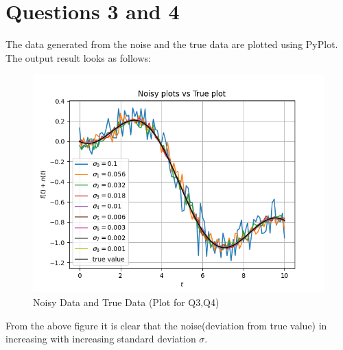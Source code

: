 \documentclass[11pt, a4paper]{article}
\begin{document}
         \section{Questions 3 and 4}
            The data generated from the noise and the true data are plotted using PyPlot. The output result looks as follows:
            \begin{figure}[H]
                \centering
                \includegraphics[scale=0.9]{Figure0.png}
                \caption{Noisy Data and True Data (Plot for Q3,Q4)}
                
            \end{figure}
            
            From the above figure it is clear that the noise(deviation from true value) in increasing with increasing standard deviation $\sigma$.\\
            
\end{document}
